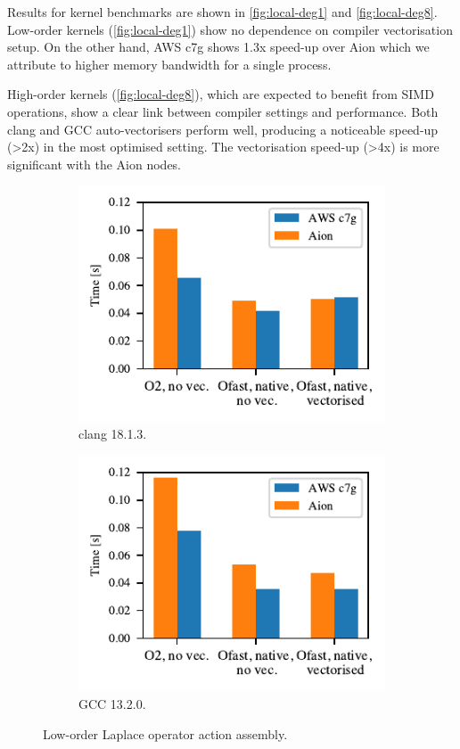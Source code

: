Results for kernel benchmarks are shown in \autoref{fig:local-deg1}
and \autoref{fig:local-deg8}. Low-order kernels (\autoref{fig:local-deg1}) show no
dependence on compiler vectorisation setup. On the other hand, AWS c7g shows
1.3x speed-up over Aion which we attribute to higher memory bandwidth for a
single process.

High-order kernels (\autoref{fig:local-deg8}), which are expected to benefit from
SIMD operations, show a clear link between compiler settings and performance.
Both clang and GCC auto-vectorisers perform well, producing a noticeable
speed-up (\textgreater 2x) in the most optimised setting. The vectorisation
speed-up (\textgreater 4x) is more significant with the Aion nodes.

\begin{figure}
    \begin{subfigure}{.5\textwidth}
        \centering
        \includegraphics{chapters/chp1/graphics/kernel_plots/local_operator_clang_deg1.pdf}
        \caption{clang 18.1.3.}
        \label{fig:local-clang-deg1}
    \end{subfigure}%
    \begin{subfigure}{.5\textwidth}
        \centering
        \includegraphics{chapters/chp1/graphics/kernel_plots/local_operator_gcc_deg1.pdf}
        \caption{GCC 13.2.0.}
        \label{fig:local-gcc-deg1}
    \end{subfigure}
    \caption{Low-order Laplace operator action assembly.}
    \label{fig:local-deg1}
\end{figure}

